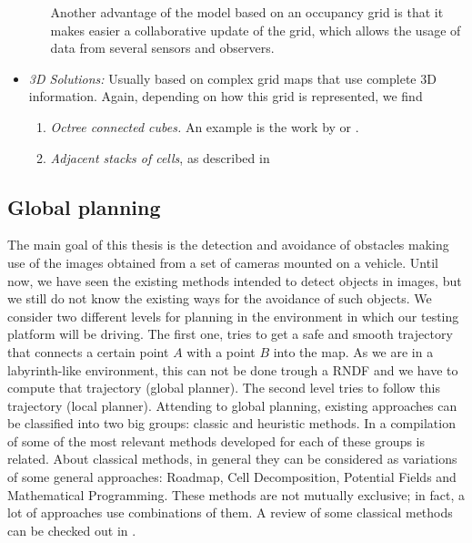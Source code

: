 \begin{itemize}
\begin{enumerate}
   Another advantage of the model based on an occupancy grid is that it makes easier a collaborative update of the grid, which allows the usage of data from several sensors and observers.
  \end{enumerate} 
 \item \emph{3D Solutions:} Usually based on complex grid maps that use complete 3D information. Again, depending on how this grid is represented, we find 
 \begin{enumerate}
   \item \emph{Octree connected cubes.} An example is the work by \cite{wurm2010octomap} or \cite{broggi2013}.
   \item \emph{Adjacent stacks of cells}, as described in \cite{Moravec96robotspatial} 
 \end{enumerate}
\end{itemize}

\subsection{Global planning}\label{ch:chapter00_02_06}

The main goal of this thesis is the detection and avoidance of obstacles making use of the images obtained from a set of cameras mounted on a vehicle. Until now, we have seen the existing methods intended to detect objects in images, but we still do not know the existing ways for the avoidance of such objects. We consider two different levels for planning in the environment in which our testing platform will be driving. The first one, tries to get a safe and smooth trajectory that connects a certain point $A$ with a point $B$ into the map. As we are in a labyrinth-like environment, this can not be done trough a \ac{RNDF} and we have to compute that trajectory (global planner). The second level tries to follow this trajectory (local planner).
Attending to global planning, existing approaches can be classified into two big groups: classic and heuristic methods. In \cite{masehian2007classic} a compilation of some of the most relevant methods developed for each of these groups is related.
About classical methods, in general they can be considered as variations of some general approaches: Roadmap, Cell Decomposition, Potential Fields and Mathematical Programming. These methods are not mutually exclusive; in fact, a lot of approaches use combinations of them. A review of some classical methods can be checked out in \cite{hwang1992gross}.
 
